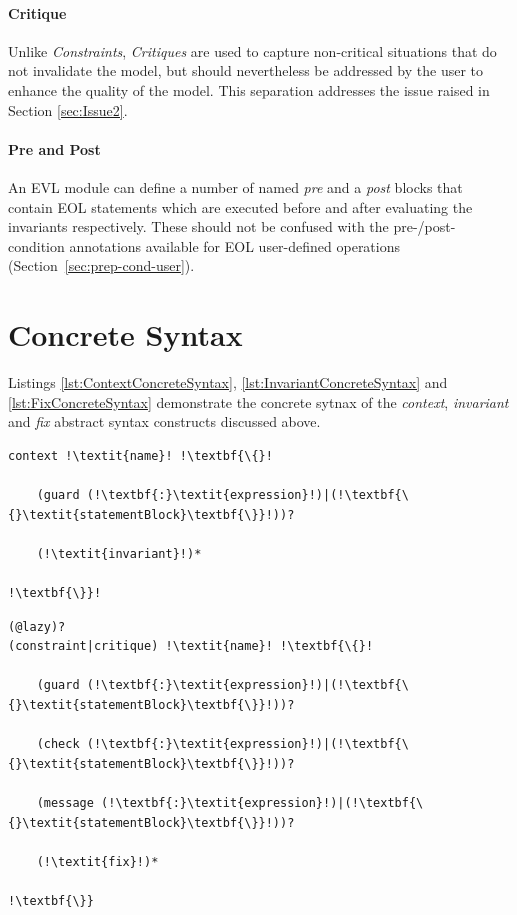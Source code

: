 \paragraph{Critique}
Unlike \emph{Constraints}, \emph{Critiques} are used to capture non-critical situations that do not invalidate the model, but should nevertheless be addressed by the user to enhance the quality of the model. This separation addresses the issue raised in Section \ref{sec:Issue2}.

\paragraph{Pre and Post}
An EVL module can define a number of named \emph{pre} and a \emph{post} blocks that contain EOL statements which are executed before and after evaluating the invariants respectively. These should not be confused with the pre-/post-condition annotations available for EOL user-defined operations (Section~\ref{sec:prep-cond-user}).

\section{Concrete Syntax}

Listings \ref{lst:ContextConcreteSyntax}, \ref{lst:InvariantConcreteSyntax} and \ref{lst:FixConcreteSyntax} demonstrate the concrete sytnax of the \emph{context}, \emph{invariant} and \emph{fix} abstract syntax constructs discussed above.

\begin{lstlisting}[caption=Concrete Syntax of an EVL context, label=lst:ContextConcreteSyntax, language=EVL, escapechar=!]
context !\textit{name}! !\textbf{\{}!

	(guard (!\textbf{:}\textit{expression}!)|(!\textbf{\{}\textit{statementBlock}\textbf{\}}!))?
	
	(!\textit{invariant}!)*
	
!\textbf{\}}!
\end{lstlisting}

\begin{lstlisting}[caption=Concrete Syntax of an EVL invariant, label=lst:InvariantConcreteSyntax, language=EVL, escapechar=!]
(@lazy)?
(constraint|critique) !\textit{name}! !\textbf{\{}!
	
	(guard (!\textbf{:}\textit{expression}!)|(!\textbf{\{}\textit{statementBlock}\textbf{\}}!))?
	
	(check (!\textbf{:}\textit{expression}!)|(!\textbf{\{}\textit{statementBlock}\textbf{\}}!))?
	
	(message (!\textbf{:}\textit{expression}!)|(!\textbf{\{}\textit{statementBlock}\textbf{\}}!))?
	
	(!\textit{fix}!)*
	
!\textbf{\}}
\end{lstlisting}


